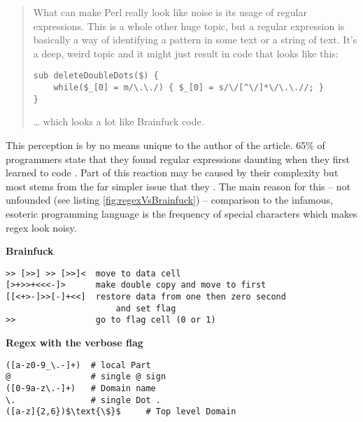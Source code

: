 {\small
\begin{quote}
    What can make Perl really look like noise is its usage of regular expressions. This is a whole other huge topic, but a regular expression is basically a way of identifying a pattern in some text or a string of text. It's a deep, weird topic and it might just result in code that looks like this:

\vspace{1cm}
\begin{minipage}{\linewidth}
\begin{verbatim}
sub deleteDoubleDots($) { 
    while($_[0] = m/\.\./) { $_[0] = s/\/[^\/]*\/\.\.//; } 
}
\end{verbatim}
\end{minipage}

… which looks a lot like Brainfuck code.
\end{quote}

}

This perception is by no means unique to the author of the article. 65\% of programmers state that they found regular expressions daunting when they first learned to code \cite{RegexesAreHard}. Part of this reaction may be caused by their complexity but most stems from the far simpler issue that they  \cite{ViceProgrammingLanguagesProgrammersHate}. The main reason for this  -- not unfounded (see listing \ref{fig:regexVsBrainfuck}) -- comparison to the infamous, esoteric programming language is the frequency of special characters which makes regex look noisy.


{
\hypersetup{citecolor=white}
\begin{listingBox}[title={Comparison of Regex \cite{regexWithComments} and Brainfuck \cite{brainfuckExample}},label=fig:regexVsBrainfuck,width=15.7cm,center]
    \textbf{Brainfuck}

\begin{lstlisting}[basicstyle=\ttfamily]
>> [>>] >> [>>]<  move to data cell
[>+>>+<<<-]>      make double copy and move to first
[[<+>-]>>[-]+<<]  restore data from one then zero second 
                      and set flag
>>                go to flag cell (0 or 1)
\end{lstlisting}

\textbf{Regex with the verbose flag}
    \begin{lstlisting}[basicstyle=\ttfamily,mathescape=true]
([a-z0-9_\.-]+)  # local Part
@                # single @ sign
([0-9a-z\.-]+)   # Domain name
\.               # single Dot .
([a-z]{2,6})$\text{\$}$     # Top level Domain
\end{lstlisting}
\end{listingBox}
}


